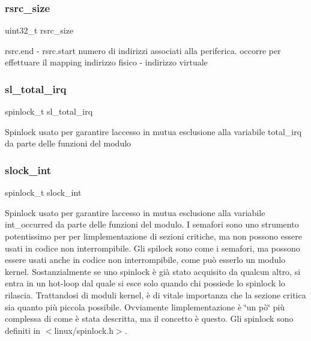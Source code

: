 \subsubsection{\texorpdfstring{rsrc\+\_\+size}{rsrc\_size}}
{\footnotesize\ttfamily uint32\+\_\+t rsrc\+\_\+size}

rsrc.\+end -\/ rsrc.\+start numero di indirizzi associati alla periferica. occorre per effettuare il mapping indirizzo fisico -\/ indirizzo virtuale \mbox{\label{structmy_g_p_i_o_k__t_ac41bbc7fe03ef25b7f468275fb565d78}} 
\subsubsection{\texorpdfstring{sl\+\_\+total\+\_\+irq}{sl\_total\_irq}}
{\footnotesize\ttfamily spinlock\+\_\+t sl\+\_\+total\+\_\+irq}

Spinlock usato per garantire l\textquotesingle{}accesso in mutua esclusione alla variabile total\+\_\+irq da parte delle funzioni del modulo \mbox{\label{structmy_g_p_i_o_k__t_a1e1ddf972b4dc84dd331a0c72e5d9895}} 
\subsubsection{\texorpdfstring{slock\+\_\+int}{slock\_int}}
{\footnotesize\ttfamily spinlock\+\_\+t slock\+\_\+int}

Spinlock usato per garantire l\textquotesingle{}accesso in mutua esclusione alla variabile int\+\_\+occurred da parte delle funzioni del modulo. I semafori sono uno strumento potentissimo per per l\textquotesingle{}implementazione di sezioni critiche, ma non possono essere usati in codice non interrompibile. Gli spilock sono come i semafori, ma possono essere usati anche in codice non interrompibile, come può esserlo un modulo kernel. Sostanzialmente se uno spinlock è già stato acquisito da qualcun altro, si entra in un hot-\/loop dal quale si esce solo quando chi possiede lo spinlock lo rilascia. Trattandosi di moduli kernel, è di vitale importanza che la sezione critica sia quanto più piccola possibile. Ovviamente l\textquotesingle{}implementazione è \char`\"{}un pò\char`\"{} più complessa di come è stata descritta, ma il concetto è questo. Gli spinlock sono definiti in $<$linux/spinlock.\+h$>$. \mbox{\label{structmy_g_p_i_o_k__t_a2da711ac290a9613b8d8af97f122b997}} 
